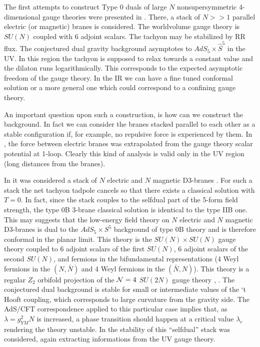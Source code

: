 \documentclass[a4paper,12pt]{article}
\begin{document}
The first attempts to construct Type 0 duals of large $N$ nonsupersymmetric
4-dimensional gauge theories were presented in \cite{kt}. There, a stack of 
$N>>1$ parallel electric (or magnetic) branes is considered. The worldvolume 
gauge theory is $SU(N)$ coupled with 6 adjoint scalars. The tachyon may be stabilized by RR flux. The conjectured dual gravity background asymptotes to 
$AdS_5\times \hat S^5$ in the UV. In this region the tachyon is supposed to relax towards a constant value and the dilaton runs logarithmically. This corresponds to the expected asymptotic freedom of the gauge theory. In the IR we can have a fine tuned conformal solution \cite{kt0} or a more general one \cite{minahan} which could correspond to a confining gauge theory.
 
An important question upon such a construction, is how can we construct the
background. In fact we can consider the branes stacked parallel to each other 
as a stable configuration if, for example, no repulsive force is experienced
by them. In \cite{z}, \cite{tz} the force between electric branes was 
extrapolated from the gauge theory scalar potential at 1-loop. Clearly this kind of analysis is valid only in the UV region (long distances from the branes).

In \cite{kt1} it was considered a stack of $N$ electric and $N$ magnetic D3-branes . For such a stack the net tachyon tadpole cancels so that there
exists a classical solution with $T=0$. In fact, since the stack couples
to the selfdual part of the 5-form field strength, the type 0B 3-brane classical solution is identical to the type IIB one. This may suggests that 
the low-energy field theory on $N$ electric and $N$ magnetic D3-branes is dual to the $AdS_5\times S^5$ background of type 0B theory and is therefore conformal in the planar limit. This theory is the $SU(N)\times SU(N)$ gauge theory coupled to 6 adjoint scalars of the first $SU(N)$, 6 adjoint scalars of the second $SU(N)$, and fermions in the bifundamental representations (4 Weyl fermions in the $(N, \bar N)$ and 4 Weyl fermions in the $(\bar N, N)$). This theory is a regular $Z_2$ orbifold projection of the ${\cal N}=4$ $SU(2N)$ gauge 
theory \cite{kt1}, \cite{ns}. The conjectured dual background is stable for small or intermediate
values of the `t Hooft coupling, which corresponds to large curvature from the gravity 
side. The AdS/CFT correspondence applied to this particular case implies \cite{k} that, 
as $\lambda = g_{YM}^2 N$ is increased, a phase transition should happen at a critical 
value $\lambda_c$ rendering the theory unstable.
In \cite{tz} the stability of this ``selfdual'' stack was considered, again
extracting informations from the UV gauge theory.
\end{document}
